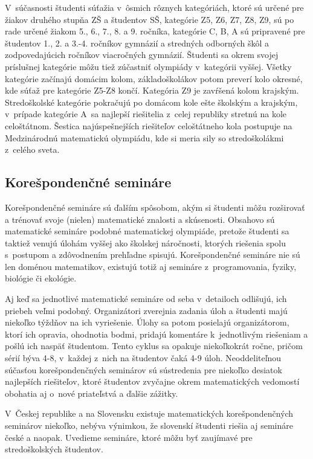 V~súčasnosti študenti súťažia v~ôsmich rôznych kategóriách, ktoré sú určené pre žiakov druhého stupňa ZŠ a študentov SŠ, kategórie Z5, Z6, Z7, Z8, Z9, sú po rade určené žiakom 5., 6., 7., 8. a 9. ročníka, kategórie C, B, A sú pripravené pre študentov 1., 2. a 3.-4. ročníkov gymnázií a stredných odborných škôl a zodpovedajúcich ročníkov viacročných gymnázií. Študenti sa okrem svojej príslušnej kategórie môžu tiež zúčastniť olympiády v~kategórii vyššej. Všetky kategórie začínajú domácim kolom, základoškolákov potom preverí kolo okresné, kde súťaž pre kategórie Z5-Z8 končí. Kategória Z9 je zavŕšená kolom krajským. Stredoškolské kategórie pokračujú po domácom kole ešte školským a krajským, v~prípade kategórie A~sa najlepší riešitelia z~celej republiky stretnú na kole celoštátnom. Šestica najúspešnejších riešiteľov celoštátneho kola postupuje na Medzinárodnú matematickú olympiádu, kde si meria sily so stredoškolákmi z~celého sveta.

\subsection*{Korešpondenčné semináre}

Korešpondenčné semináre sú ďalším spôsobom, akým si študenti môžu rozširovať a trénovať svoje (nielen) matematické znalosti a skúsenosti. Obsahovo sú matematické semináre podobné matematickej olympiáde, pretože študenti sa taktiež venujú úlohám vyššej ako školskej náročnosti, ktorých riešenia spolu s~postupom a zdôvodnením prehľadne spisujú. Korešpondenčné semináre nie sú len doménou matematikov, existujú totiž aj semináre z~programovania, fyziky, biológie či ekológie.

Aj keď sa jednotlivé matematické semináre od seba v~detailoch odlišujú, ich priebeh veľmi podobný. Organizátori zverejnia zadania úloh a študenti majú niekoľko týždňov na ich vyriešenie. Úlohy sa potom posielajú organizátorom, ktorí ich opravia, ohodnotia bodmi, pridajú komentáre k~jednotlivým riešeniam a pošlú ich naspäť študentom. Tento cyklus sa opakuje niekoľkokrát ročne, pričom sérií býva 4-8, v~každej z~nich na študentov čaká 4-9 úloh. Neoddeliteľnou súčasťou korešpondenčných seminárov sú sústredenia pre niekoľko desiatok najlepších riešiteľov, ktoré študentov zvyčajne okrem matematických vedomostí obohatia aj o~nové priateľstvá a ďalšie zážitky.

V~Českej republike a na Slovensku existuje matematických korešpondenčných seminárov niekoľko, nebýva výnimkou, že slovenskí študenti riešia aj semináre české a naopak. Uvedieme semináre, ktoré môžu byť zaujímavé pre stredoškolských študentov.

